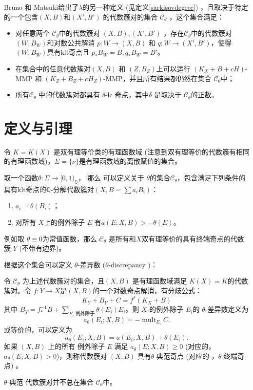 Bruno 和 Matsuki给出了$\lambda$的另一种定义 (见定义\ref{sarkisovdegree}) ，且取决于特定的一个包含$(X,B)$和$(X',B')$ 的代数簇对的集合 $\mathcal{C}_{\theta}$ ，这个集合满足：
\begin{itemize}
  \item
   对任意两个  $\mathcal{C}_{\theta}$中的代数簇对 $(X,B),(X',B')$ ，存在$\mathcal{C}_{\theta}$中的代数簇对 $(W,B_W)$和对数公共解消 $p:W\to (X,B)$ 和 $q:W\to (X',B')$，使得 $(W,B_W)$具有klt奇点且 $p_*B_W=B,q_*B_W=B'$。
  \item  在集合中的任意代数簇对$(X,B)$ 和 $(Z,B_Z)$上可以运行  $(K_X+B+cH)$-MMP 和 $(K_Z+B_Z+cH_Z)$-MMP，并且所有结果都仍然在集合 $\mathcal{C}_{\theta}$中；
  \item 所有$\mathcal{C}_{\theta}$ 中的代数簇对都具有 $\delta$-lc 奇点，其中$\delta$ 是取决于 $\mathcal{C}_{\theta}$的正数。 
\end{itemize}

\section{定义与引理}
令 $ K=K(X) $ 是双有理等价类的有理函数域 (注意到双有理等价的代数簇有相同的有理函数域)，$ \Sigma=\{\nu\} $是有理函数域的离散赋值的集合。
\begin{definition}\label{thetacategory}
  \cite[Definition 3.5]{brunoLogSarkisovProgram1995}
  取一个函数$\theta:\Sigma\to [0,1)_{\mathbb{Q}}$， 那么 可以定义关于  $\theta$的集合$ \mathcal{C}_{\theta} $，包含满足下列条件的具有klt奇点的$\mathbb{Q}$-分解代数簇对$ (X,B=\sum a_{i}B_{i}) $：
  \begin{enumerate}
    \item $ a_i=\theta(B_i) $；
    \item 对所有 $ X $上的例外除子 $E $ 有$ a(E;X,B)>-\theta(E) $。
  \end{enumerate}
\end{definition}
\begin{remark}
例如取 $\theta \equiv 0$为常值函数，那么 $\mathcal{C}_{\theta}$ 是所有和$X$双有理等价的具有终端奇点的代数簇 $Y$ (不带有边界)。
\end{remark}
  根据这个集合可以定义 $\theta$-差异数 ($\theta$-discrepancy )：
\begin{definition}
  令 $\mathcal{C}_{\theta}$ 为上述代数簇对的集合，且$(X, B)$ 是有理函数域满足 $K(X)=K$的代数簇对。令  $f: Y\to X$是$(X, B)$的一个对数奇点解消，有分歧公式：
  \[ K_{Y}+B_{Y}+C=f^*(K_{X}+B) \]
  其中 $B_{Y}=f^{-1}_*B+ \sum_{E_{i}\text{ 例外除子}} \theta(E_{i})E_{i}$。则 $X$ 的例外除子 $E_{i}$的 $\theta$-差异数定义为
  \[ a_{\theta}(E_{i};X,B)=-\operatorname{mult}_{E_{i}}C. \]
  或等价的，可以定义为
  \[ a_{\theta}(E_{i};X,B)=a(E_{i};X,B)+\theta(E_{i}). \]
  如果 $(X,B)$ 上的所有 例外除子 $E$ 满足   $a_{\theta}(E;X,B)\geqslant 0$ (对应的， $a_{\theta}(E;X,B)> 0$)，则称代数簇对 $(X,B)$ 具有$\theta$-典范奇点 (对应的 ，$\theta$-终端奇点)  。
\end{definition}
\begin{remark}
 $\theta$-典范 代数簇对并不总在集合 $\mathcal{C}_{\theta}$中。
\end{remark}

